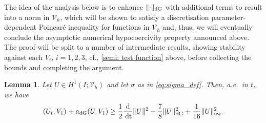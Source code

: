 \documentclass{amsart}
\newcommand{\norm}[2]{\|{#1}\|_{{#2}}}
\newcommand{\dee}{{\rm d}}
\newcommand{\inner}[3]{({#1},{#2})_{{#3}}}
\newcommand{\dt}{\,{\rm dt}}
\newtheorem{lemma}[theorem]{Lemma}
\theoremstyle{definition}
\theoremstyle{remark}
\numberwithin{equation}{section}
\begin{document}
The idea of the analysis below is to enhance $\norm{\cdot}{\rm dG}$ with additional terms to result into a norm in $ {\mathcal{V}}_h$, which will be shown to satisfy a discretisation parameter-dependent Poincar\'e inequality for functions in $ {\mathcal{V}}_h$ and, thus, we will eventually conclude the asymptotic numerical hypocoercivity property announced above. The proof will be split to a number of intermediate results, showing stability against each $V_i$, $i=1,2,3$, cf., \eqref{semi: test function} above, before collecting the bounds and completing the argument.
\begin{lemma}\label{lem:semi:U}
    Let $U \in H^1(I; {\mathcal{V}}_h)$ and let $\sigma$ as in \eqref{eq:sigma_def}. Then, a.e.~in $t$, we have
\[
   \inner{U_t}{V_1}{} + a_{\rm dG}(U,V_1)
        \geq
   \frac{1}{2}\frac{\dee}{\dt} \norm{U}{}^2
        +
      \frac{7}{8}\norm{U}{\rm dG}^2
         +\frac{1}{16}\norm{U}{\rm uw}^2.
\]
\end{lemma}
\end{document}
